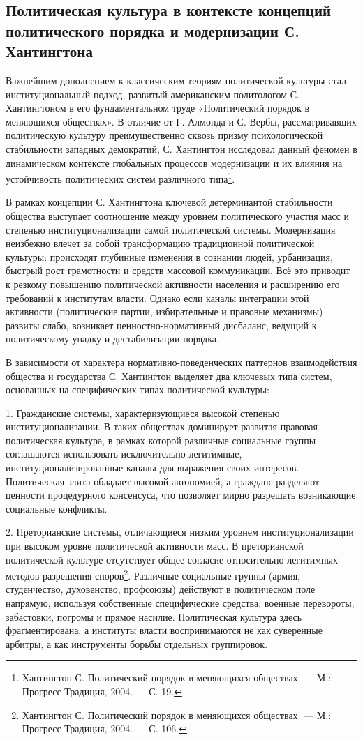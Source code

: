 \subsection{Политическая культура в контексте концепций политического порядка и модернизации С. Хантингтона}

Важнейшим дополнением к классическим теориям политической культуры стал институциональный подход, развитый американским политологом С. Хантингтоном в его фундаментальном труде «Политический порядок в меняющихся обществах». В отличие от Г. Алмонда и С. Вербы, рассматривавших политическую культуру преимущественно сквозь призму психологической стабильности западных демократий, С. Хантингтон исследовал данный феномен в динамическом контексте глобальных процессов модернизации и их влияния на устойчивость политических систем различного типа\footnote{Хантингтон С. Политический порядок в меняющихся обществах. --- М.: Прогресс-Традиция, 2004. --- С. 19.}.

В рамках концепции С. Хантингтона ключевой детерминантой стабильности общества выступает соотношение между уровнем политического участия масс и степенью институционализации самой политической системы. Модернизация неизбежно влечет за собой трансформацию традиционной политической культуры: происходят глубинные изменения в сознании людей, урбанизация, быстрый рост грамотности и средств массовой коммуникации. Всё это приводит к резкому повышению политической активности населения и расширению его требований к институтам власти. Однако если каналы интеграции этой активности (политические партии, избирательные и правовые механизмы) развиты слабо, возникает ценностно-нормативный дисбаланс, ведущий к политическому упадку и дестабилизации порядка.

В зависимости от характера нормативно-поведенческих паттернов взаимодействия общества и государства С. Хантингтон выделяет два ключевых типа систем, основанных на специфических типах политической культуры:

1. Гражданские системы, характеризующиеся высокой степенью институционализации. В таких обществах доминирует развитая правовая политическая культура, в рамках которой различные социальные группы соглашаются использовать исключительно легитимные, институционализированные каналы для выражения своих интересов. Политическая элита обладает высокой автономией, а граждане разделяют ценности процедурного консенсуса, что позволяет мирно разрешать возникающие социальные конфликты.

2. Преторианские системы, отличающиеся низким уровнем институционализации при высоком уровне политической активности масс. В преторианской политической культуре отсутствует общее согласие относительно легитимных методов разрешения споров\footnote{Хантингтон С. Политический порядок в меняющихся обществах. --- М.: Прогресс-Традиция, 2004. --- С. 106.}. Различные социальные группы (армия, студенчество, духовенство, профсоюзы) действуют в политическом поле напрямую, используя собственные специфические средства: военные перевороты, забастовки, погромы и прямое насилие. Политическая культура здесь фрагментирована, а институты власти воспринимаются не как суверенные арбитры, а как инструменты борьбы отдельных группировок.

